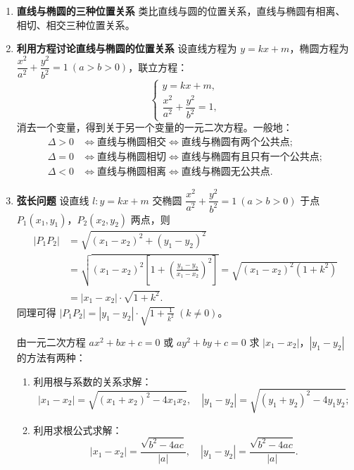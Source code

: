 \documentclass{article}
\begin{document}
\begin{enumerate}
    \item \textbf{直线与椭圆的三种位置关系}
    类比直线与圆的位置关系，直线与椭圆有相离、相切、相交三种位置关系。
    
    \item \textbf{利用方程讨论直线与椭圆的位置关系}
    设直线方程为 \(y = kx + m\)，椭圆方程为 \(\dfrac{x^2}{a^2} + \dfrac{y^2}{b^2} = 1\ (a > b > 0)\)，联立方程：
    \[
    \begin{cases}
    y = kx + m, \\
    \dfrac{x^2}{a^2} + \dfrac{y^2}{b^2} = 1,
    \end{cases}
    \]
    消去一个变量，得到关于另一个变量的一元二次方程。一般地：
    \[
    \begin{aligned}
    \Delta > 0 &\iff \text{直线与椭圆相交} \iff \text{直线与椭圆有两个公共点}; \\
    \Delta = 0 &\iff \text{直线与椭圆相切} \iff \text{直线与椭圆有且只有一个公共点}; \\
    \Delta < 0 &\iff \text{直线与椭圆相离} \iff \text{直线与椭圆无公共点}.
    \end{aligned}
    \]
    
    \item \textbf{弦长问题}
    设直线 \(l: y = kx + m\) 交椭圆 \(\dfrac{x^2}{a^2} + \dfrac{y^2}{b^2} = 1\ (a > b > 0)\) 于点 \(P_1(x_1, y_1)\)，\(P_2(x_2, y_2)\) 两点，则
    \[
    \begin{aligned}
    |P_1P_2| &= \sqrt{(x_1 - x_2)^2 + (y_1 - y_2)^2} \\
    &= \sqrt{(x_1 - x_2)^2\left[1 + \left(\frac{y_1 - y_2}{x_1 - x_2}\right)^2\right]} = \sqrt{(x_1 - x_2)^2(1 + k^2)} \\
    &= |x_1 - x_2| \cdot \sqrt{1 + k^2}.
    \end{aligned}
    \]
    同理可得 \(|P_1P_2| = |y_1 - y_2| \cdot \sqrt{1 + \frac{1}{k^2}}\ (k \neq 0)\)。
    
    由一元二次方程 \(ax^2 + bx + c = 0\) 或 \(ay^2 + by + c = 0\) 求 \(|x_1 - x_2|\)，\(|y_1 - y_2|\) 的方法有两种：
    \begin{enumerate}
        \item 利用根与系数的关系求解：
        \[
        |x_1 - x_2| = \sqrt{(x_1 + x_2)^2 - 4x_1x_2},\quad |y_1 - y_2| = \sqrt{(y_1 + y_2)^2 - 4y_1y_2};
        \]
        \item 利用求根公式求解：
        \[
        |x_1 - x_2| = \frac{\sqrt{b^2 - 4ac}}{|a|},\quad |y_1 - y_2| = \frac{\sqrt{b^2 - 4ac}}{|a|}.
        \]
    \end{enumerate}
\end{enumerate}
\vspace{1\baselineskip}
\end{document}

